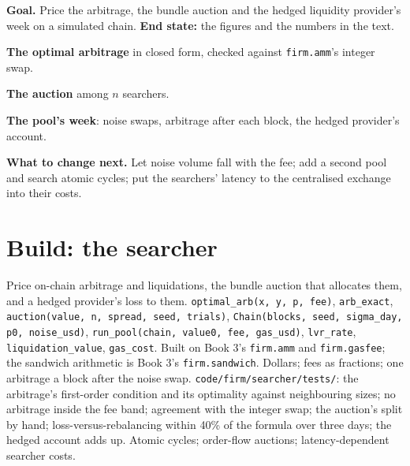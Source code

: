 \begin{tutorial}
\textbf{Goal.} Price the arbitrage, the bundle auction and the hedged liquidity provider's week on a simulated chain. \textbf{End state:} the
figures and the numbers in the text.
\begin{tutsteps}
\item \textbf{The optimal arbitrage} in closed form, checked against \texttt{firm.amm}'s integer swap.
\label{lst:hf:on-chain-trading:arb}
\item \textbf{The auction} among $n$ searchers.
\label{lst:hf:on-chain-trading:auction}
\item \textbf{The pool's week}: noise swaps, arbitrage after each block, the hedged provider's account.
\label{lst:hf:on-chain-trading:pool}
\end{tutsteps}
\textbf{What to change next.} Let noise volume fall with the fee; add a second pool and search atomic cycles; put the searchers' latency to the
centralised exchange into their costs.
\end{tutorial}

\section{Build: the searcher}\label{bld:hf:on-chain-trading:searcher}

\begin{build}
 Price on-chain arbitrage and liquidations, the bundle auction that allocates them, and a hedged provider's loss to them.
 \texttt{optimal\_arb(x, y, p, fee)}, \texttt{arb\_exact}, \texttt{auction(value, n, spread, seed, trials)}, \texttt{Chain(blocks,
seed, sigma\_day, p0, noise\_usd)}, \texttt{run\_pool(chain, value0, fee, gas\_usd)}, \texttt{lvr\_rate}, \texttt{liquidation\_value},
\texttt{gas\_cost}. Built on Book 3's \texttt{firm.amm} and \texttt{firm.gasfee}; the sandwich arithmetic is Book 3's \texttt{firm.sandwich}.
 Dollars; fees as fractions; one arbitrage a block after the noise swap.
 \texttt{code/firm/searcher/tests/}: the arbitrage's first-order condition and its optimality against neighbouring sizes; no
arbitrage inside the fee band; agreement with the integer swap; the auction's split by hand; loss-versus-rebalancing within 40\% of the formula over
three days; the hedged account adds up.
 Atomic cycles; order-flow auctions; latency-dependent searcher costs.
\end{build}

